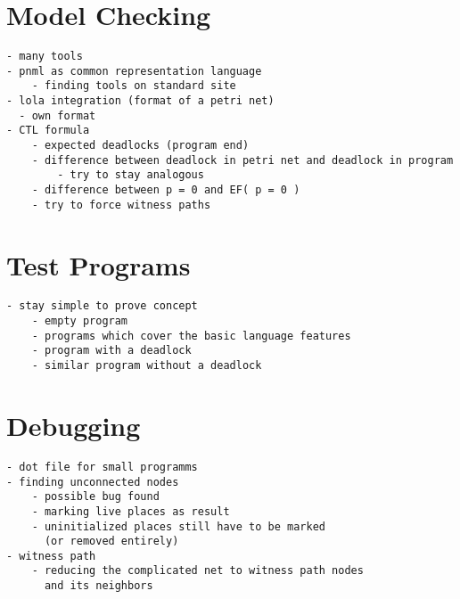\section{Model Checking}
\label{app_mc}
\begin{verbatim}
- many tools
- pnml as common representation language
    - finding tools on standard site
- lola integration (format of a petri net)
  - own format
- CTL formula
    - expected deadlocks (program end)
    - difference between deadlock in petri net and deadlock in program
        - try to stay analogous
    - difference between p = 0 and EF( p = 0 )
    - try to force witness paths
\end{verbatim}

\section{Test Programs}
\label{app_test}
\begin{verbatim}
- stay simple to prove concept
    - empty program
    - programs which cover the basic language features
    - program with a deadlock
    - similar program without a deadlock
\end{verbatim}

\section{Debugging}
\label{app_debug}
\begin{verbatim}
- dot file for small programms
- finding unconnected nodes
    - possible bug found
    - marking live places as result
    - uninitialized places still have to be marked
      (or removed entirely)
- witness path
    - reducing the complicated net to witness path nodes 
      and its neighbors
\end{verbatim}